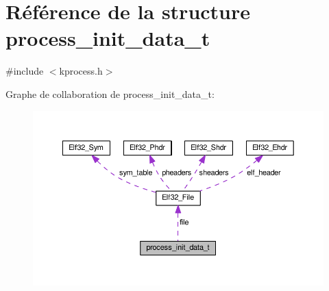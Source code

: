 \hypertarget{structprocess__init__data__t}{\section{Référence de la structure process\+\_\+init\+\_\+data\+\_\+t}
\label{structprocess__init__data__t}
}


{\ttfamily \#include $<$kprocess.\+h$>$}



Graphe de collaboration de process\+\_\+init\+\_\+data\+\_\+t\+:
\nopagebreak
\begin{figure}[H]
\begin{center}
\leavevmode
\includegraphics[width=350pt]{structprocess__init__data__t__coll__graph}
\end{center}
\end{figure}
